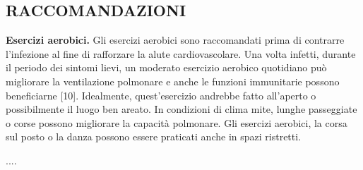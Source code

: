 \documentclass[onecolumn,journal]{IEEEtran}
\begin{document}
\begin{multicols}{2}
\section*{RACCOMANDAZIONI}
\textbf{Esercizi aerobici.} Gli esercizi aerobici sono raccomandati prima di contrarre l'infezione al fine di rafforzare la alute cardiovascolare. Una volta infetti, durante il periodo dei sintomi lievi, un moderato esercizio aerobico quotidiano può migliorare la ventilazione polmonare e anche le funzioni immunitarie possono beneficiarne [10]. Idealmente, quest'esercizio andrebbe fatto all'aperto o possibilmente il luogo ben areato. In condizioni di clima mite, lunghe passeggiate o corse possono migliorare la capacità polmonare. Gli esercizi aerobici, la corsa sul posto o la danza possono essere praticati anche in spazi ristretti.

....



\end{multicols}
\end{document}
